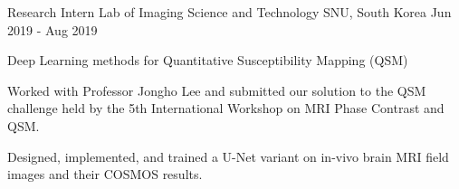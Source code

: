 \begin{cventries}
  \cventry
    {Research Intern} %
    {Lab of Imaging Science and Technology} %
    {SNU, South Korea} %
    {Jun 2019 - Aug 2019} %
    {
      \begin{cvitems} %
        \item {Deep Learning methods for Quantitative Susceptibility Mapping (QSM)}
        \item {Worked with Professor Jongho Lee and submitted our solution to the QSM challenge held by the 5th International Workshop on MRI Phase Contrast and QSM.}
        \item {Designed, implemented, and trained a U-Net variant on in-vivo brain MRI field images and their COSMOS results.}
      \end{cvitems}
    }

\end{cventries}

